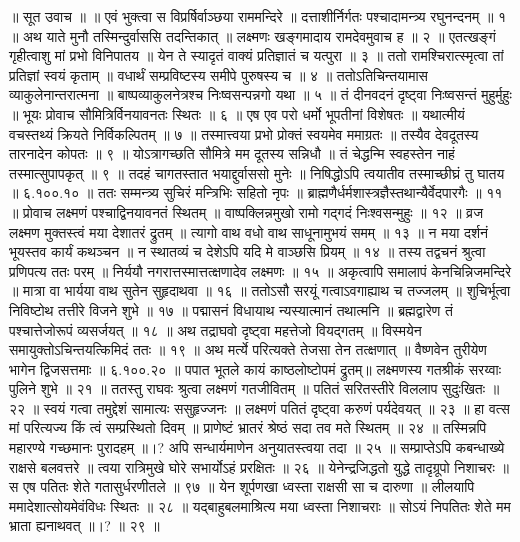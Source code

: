 ॥ सूत उवाच ॥ ॥
एवं भुक्त्वा स विप्रर्षिर्वाञ्छया राममन्दिरे ॥
दत्ताशीर्निर्गतः पश्चादामन्त्र्य रघुनन्दनम् ॥ १ ॥
अथ याते मुनौ तस्मिन्दुर्वाससि तदन्तिकात् ॥
लक्ष्मणः खङ्गमादाय रामदेवमुवाच ह ॥ २ ॥
एतत्खङ्गं गृहीत्वाशु मां प्रभो विनिपातय ॥
येन ते स्यादृतं वाक्यं प्रतिज्ञातं च यत्पुरा ॥ ३ ॥
ततो रामश्चिरात्स्मृत्वा तां प्रतिज्ञां स्वयं कृताम् ॥
वधार्थं सम्प्रविष्टस्य समीपे पुरुषस्य च ॥ ४ ॥
ततोऽतिचिन्तयामास व्याकुलेनान्तरात्मना ॥
बाष्पव्याकुलनेत्रश्च निःष्वसन्पन्नगो यथा ॥ ५ ॥
तं दीनवदनं दृष्ट्वा निःष्वसन्तं मुहुर्मुहुः ॥
भूयः प्रोवाच सौमित्रिर्विनयावनतः स्थितः ॥ ६ ॥
एष एव परो धर्मो भूपतीनां विशेषतः ॥
यथात्मीयं वचस्तथ्यं क्रियते निर्विकल्पितम् ॥ ७ ॥
तस्मात्त्वया प्रभो प्रोक्तं स्वयमेव ममाग्रतः ॥
तस्यैव देवदूतस्य तारनादेन कोपतः ॥ ९ ॥
योऽत्रागच्छति सौमित्रे मम दूतस्य सन्निधौ ॥
तं चेद्धन्मि स्वहस्तेन नाहं तस्मात्सुपापकृत् ॥ ९ ॥
तदहं चागतस्तात भयाद्दुर्वाससो मुनेः ॥
निषिद्धोऽपि त्वयातीव तस्माच्छीघ्रं तु घातय ॥ ६.१००.१० ॥
ततः सम्मन्त्र्य सुचिरं मन्त्रिभिः सहितो नृपः ॥
ब्राह्मणैर्धर्मशास्त्रज्ञैस्तथान्यैर्वेदपारगैः ॥ ११ ॥
प्रोवाच लक्ष्मणं पश्चाद्विनयावनतं स्थितम् ॥
वाष्पक्लिन्नमुखो रामो गद्गदं निःश्वसन्मुहुः ॥ १२ ॥
व्रज लक्ष्मण मुक्तस्त्वं मया देशातरं द्रुतम् ॥
त्यागो वाथ वधो वाथ साधूनामुभयं समम् ॥ १३ ॥
न मया दर्शनं भूयस्तव कार्यं कथञ्चन ॥
न स्थातव्यं च देशेऽपि यदि मे वाञ्छसि प्रियम् ॥ १४ ॥
तस्य तद्वचनं श्रुत्वा प्रणिपत्य ततः परम् ॥
निर्ययौ नगरात्तस्मात्तत्क्षणादेव लक्ष्मणः ॥ १५ ॥
अकृत्वापि समालापं केनचिन्निजमन्दिरे ॥
मात्रा वा भार्यया वाथ सुतेन सुहृदाथवा ॥ १६ ॥
ततोऽसौ सरयूं गत्वाऽवगाह्याथ च तज्जलम् ॥
शुचिर्भूत्वा निविष्टोथ तत्तीरे विजने शुभे ॥ १७ ॥
पद्मासनं विधायाथ न्यस्यात्मानं तथात्मनि ॥
ब्रह्मद्वारेण तं पश्चात्तेजोरूपं व्यसर्जयत् ॥ १८ ॥
अथ तद्राघवो दृष्ट्वा महत्तेजो वियद्गतम् ॥
विस्मयेन समायुक्तोऽचिन्तयत्किमिदं ततः ॥ १९ ॥
अथ मर्त्ये परित्यक्ते तेजसा तेन तत्क्षणात् ॥
वैष्णवेन तुरीयेण भागेन द्विजसत्तमाः ॥ ६.१००.२० ॥
पपात भूतले कायं काष्ठलोष्टोपमं द्रुतम्॥
लक्ष्मणस्य गतश्रीकं सरय्वाः पुलिने शुभे ॥ २१ ॥
ततस्तु राघवः श्रुत्वा लक्ष्मणं गतजीवितम् ॥
पतितं सरितस्तीरे विललाप सुदुःखितः ॥ २२ ॥
स्वयं गत्वा तमुद्देशं सामात्यः ससुहृज्जनः ॥
लक्ष्मणं पतितं दृष्ट्वा करुणं पर्यदेवयत् ॥ २३ ॥
हा वत्स मां परित्यज्य किं त्वं सम्प्रस्थितो दिवम् ॥
प्राणेष्टं भ्रातरं श्रेष्ठं सदा तव मते स्थितम् ॥ २४ ॥
तस्मिन्नपि महारण्ये गच्छमानः पुरादहम् ॥।?
अपि सन्धार्यमाणेन अनुयातस्त्वया तदा ॥ २५ ॥
सम्प्राप्तेऽपि कबन्धाख्ये राक्षसे बलवत्तरे ॥
त्वया रात्रिमुखे घोरे सभार्योऽहं प्ररक्षितः ॥ २६ ॥
येनेन्द्रजिद्धतो युद्धे तादृग्रूपो निशाचरः ॥
स एष पतितः शेते गतासुर्धरणीतले ॥ ९७ ॥
येन शूर्पणखा ध्वस्ता राक्षसी सा च दारुणा ॥
लीलयापि ममादेशात्सोयमेवंविधः स्थितः ॥ २८ ॥
यद्बाहुबलमाश्रित्य मया ध्वस्ता निशाचराः ॥
सोऽयं निपतितः शेते मम भ्राता ह्यनाथवत् ॥।? ॥ २९ ॥
